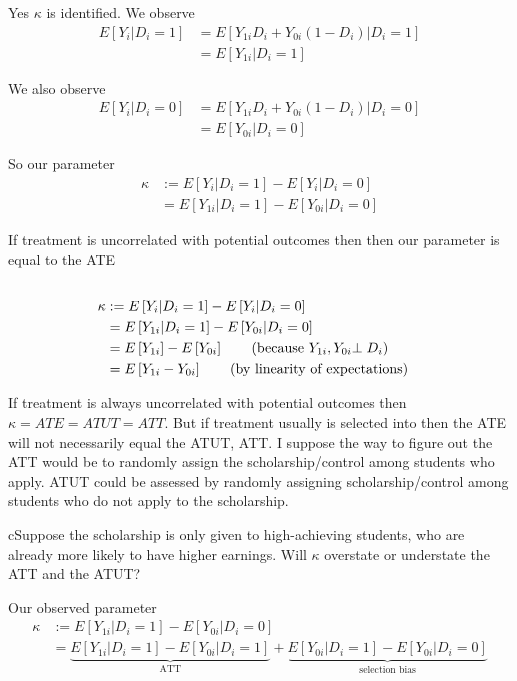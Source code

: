 \documentclass{article}
\begin{document}
Yes $\kappa$ is identified. We observe
\begin{align*}
E\left[Y_{i}|D_{i}=1\right] & =E\left[Y_{1i}D_{i}+Y_{0i}\left(1-D_{i}\right)|D_{i}=1\right]\\
 & =E\left[Y_{1i}|D_{i}=1\right]
\end{align*}

We also observe
\begin{align*}
E\left[Y_{i}|D_{i}=0\right] & =E\left[Y_{1i}D_{i}+Y_{0i}\left(1-D_{i}\right)|D_{i}=0\right]\\
 & =E\left[Y_{0i}|D_{i}=0\right]
\end{align*}

So our parameter
\begin{align*}
\kappa & :=E\left[Y_{i}|D_{i}=1\right]-E\left[Y_{i}|D_{i}=0\right]\\
 & =E\left[Y_{1i}|D_{i}=1\right]-E\left[Y_{0i}|D_{i}=0\right]
\end{align*}

If treatment is uncorrelated with potential outcomes then then our
parameter is equal to the ATE
\begin{align*}
\\
\kappa & :=E\left[Y_{i}|D_{i}=1\right]-E\left[Y_{i}|D_{i}=0\right]\\
 & =E\left[Y_{1i}|D_{i}=1\right]-E\left[Y_{0i}|D_{i}=0\right]\\
 & =E\left[Y_{1i}\right]-E\left[Y_{0i}\right]\tag{\text{because \ensuremath{Y_{1i},Y_{0i}}\ensuremath{\perp D_{i}}}}\\
 & =E\left[Y_{1i}-Y_{0i}\right]\tag{\text{by linearity of expectations}}
\end{align*}

If treatment is always uncorrelated with potential outcomes then $\kappa=ATE=ATUT=ATT$.
But if treatment usually is selected into then the ATE will not necessarily
equal the ATUT, ATT. I suppose the way to figure out the ATT would
be to randomly assign the scholarship/control among students who apply.
ATUT could be assessed by randomly assigning scholarship/control among
students who do not apply to the scholarship. \begin{problem}{c}Suppose the scholarship is only given to high-achieving students, who are already more likely to have higher earnings. Will $\kappa$ overstate or understate the ATT and the ATUT?
\end{problem}

Our observed parameter
\begin{align*}
\kappa & :=E\left[Y_{1i}|D_{i}=1\right]-E\left[Y_{0i}|D_{i}=0\right]\\
 & =\underbrace{E\left[Y_{1i}|D_{i}=1\right]-E\left[Y_{0i}|D_{i}=1\right]}_{\text{ATT}}+\underbrace{E\left[Y_{0i}|D_{i}=1\right]-E\left[Y_{0i}|D_{i}=0\right]}_{\text{selection bias}}
\end{align*}
\end{document}
